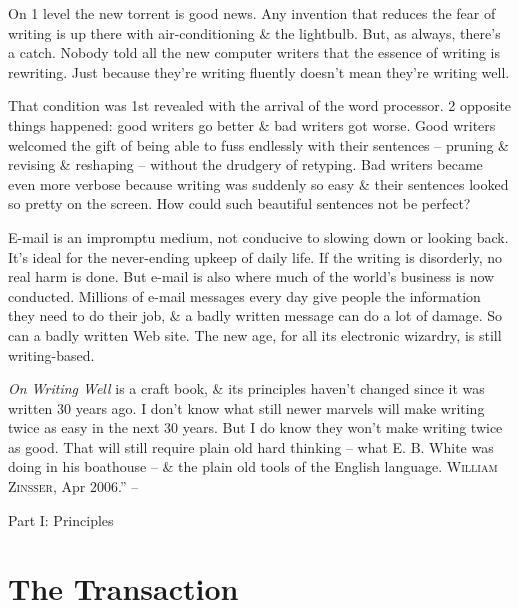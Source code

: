 \documentclass{article}
\begin{document}
On 1 level the new torrent is good news. Any invention that reduces the fear of writing is up there with air-conditioning \& the lightbulb. But, as always, there's a catch. Nobody told all the new computer writers that the essence of writing is rewriting. Just because they're writing fluently doesn't mean they're writing well.

That condition was 1st revealed with the arrival of the word processor. 2 opposite things happened: good writers go better \& bad writers got worse. Good writers welcomed the gift of being able to fuss endlessly with their sentences -- pruning \& revising \& reshaping -- without the drudgery of retyping. Bad writers became even more verbose because writing was suddenly so easy \& their sentences looked so pretty on the screen. How could such beautiful sentences not be perfect?

E-mail is an impromptu medium, not conducive to slowing down or looking back. It's ideal for the never-ending upkeep of daily life. If the writing is disorderly, no real harm is done. But e-mail is also where much of the world's business is now conducted. Millions of e-mail messages every day give people the information they need to do their job, \& a badly written message can do a lot of damage. So can a badly written Web site. The new age, for all its electronic wizardry, is still writing-based.

\textit{On Writing Well} is a craft book, \& its principles haven't changed since it was written 30 years ago. I don't know what still newer marvels will make writing twice as easy in the next 30 years. But I do know they won't make writing twice as good. That will still require plain old hard thinking -- what E. B. White was doing in his boathouse -- \& the plain old tools of the English language. \textsc{William Zinsser}, Apr 2006.'' -- \cite[pp. 5--8]{Zinsser2016}


\begin{center}\huge
	Part I: Principles
\end{center}


\section{The Transaction}

\end{document}
